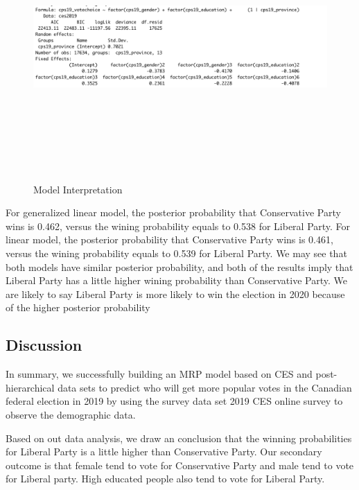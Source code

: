\documentclass[
]{article}
\begin{document}
\begin{figure}
    \centering
    \includegraphics[height=4in]{P2.png}
    \caption{Model Interpretation}
\end{figure}

For generalized linear model, the posterior probability that
Conservative Party wins is 0.462, versus the wining probability equals
to 0.538 for Liberal Party. For linear model, the posterior probability
that Conservative Party wins is 0.461, versus the wining probability
equals to 0.539 for Liberal Party. We may see that both models have
similar posterior probability, and both of the results imply that
Liberal Party has a little higher wining probability than Conservative
Party. We are likely to say Liberal Party is more likely to win the
election in 2020 because of the higher posterior probability

\hypertarget{discussion}{%
\subsection{Discussion}\label{discussion}}

In summary, we successfully building an MRP model based on CES and
post-hierarchical data sets to predict who will get more popular votes
in the Canadian federal election in 2019 by using the survey data set
2019 CES online survey to observe the demographic data.

Based on out data analysis, we draw an conclusion that the winning
probabilities for Liberal Party is a little higher than Conservative
Party. Our secondary outcome is that female tend to vote for
Conservative Party and male tend to vote for Liberal party. High
educated people also tend to vote for Liberal Party.
\end{document}

